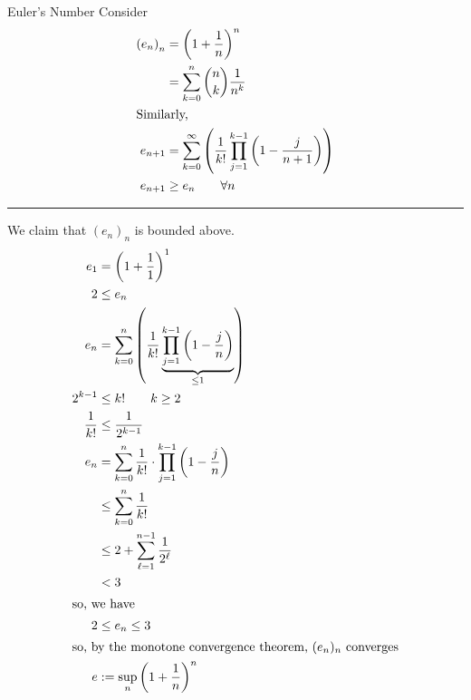 \documentclass[8pt]{extarticle}
\begin{document}
  \begin{problem}{Euler's Number}
    Consider
    \begin{align*}
      \left(e_n\right)_n &= \left(1 + \frac{1}{n}\right)^n\\
                         &= \sum_{k=0}^{n} {n\choose k}\frac{1}{n^k}\\
                         \shortintertext{Similarly,}
      e_{n+1} &= \sum_{k=0}^{\infty}\left(\frac{1}{k!} \prod_{j=1}^{k-1}\left(1-\frac{j}{n+1}\right)\right)\\
      e_{n+1} &\geq e_{n} \tag*{$\forall n$}
    \end{align*}
    \vspace{4pt}
    \rule{\textwidth}{0.4pt}
    \vspace{4pt}
    We claim that $(e_n)_n$ is bounded above.
    \begin{align*}
      e_{1} &= \left(1 + \frac{1}{1}\right)^{1}\\
      2 &\leq e_n\\
      e_{n} &= \sum_{k=0}^{n}\left(\frac{1}{k!} \underbrace{\prod_{j=1}^{k-1}\left(1-\frac{j}{n}\right)}_{\leq 1}\right)\\
      2^{k-1} &\leq k!\tag*{$k\geq 2$}\\
      \frac{1}{k!} &\leq \frac{1}{2^{k-1}}\\
      e_{n} &= \sum_{k=0}^{n} \frac{1}{k!} \cdot \prod_{j=1}^{k-1}\left(1 - \frac{j}{n}\right)\\
            &\leq \sum_{k=0}^{n}\frac{1}{k!}\\
            &\leq 2 + \sum_{\ell=1}^{n-1} \frac{1}{2^{\ell}}\\
            &< 3\\
            \shortintertext{so, we have}
      2 &\leq e_{n} \leq 3\\
      \shortintertext{so, by the monotone convergence theorem, $(e_n)_n$ converges}
      e &:= \sup_{n}\left(1 + \frac{1}{n}\right)^{n}
    \end{align*}
  \end{problem}
\end{document}
